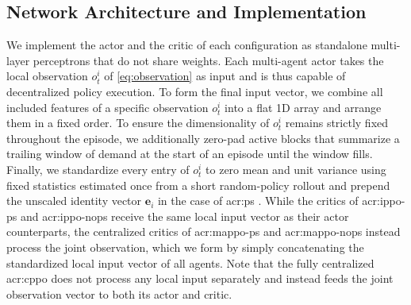 \subsection{Network Architecture and Implementation}
\label{subsec:network-architecture}
We implement the actor and the critic of each configuration as standalone multi-layer perceptrons that do not share weights. Each multi-agent actor takes the local observation $o^i_t$ of \autoref{eq:observation} as input and is thus capable of decentralized policy execution. To form the final input vector, we combine all included features of a specific observation $o_t^i$ into a flat 1D array and arrange them in a fixed order. To ensure the dimensionality of $o^i_t$ remains strictly fixed throughout the episode, we additionally zero-pad active blocks that summarize a trailing window of demand at the start of an episode until the window fills. Finally, we standardize every entry of $o_t^i$ to zero mean and unit variance using fixed statistics estimated once from a short random-policy rollout and prepend the unscaled identity vector $\mathbf{e}_i$ in the case of \gls{acr:ps} \citep{terry2020revisiting}. While the critics of \gls{acr:ippo-ps} and \gls{acr:ippo-nops} receive the same local input vector as their actor counterparts, the centralized critics of \gls{acr:mappo-ps} and \gls{acr:mappo-nops} instead process the joint observation, which we form by simply concatenating the standardized local input vector of all agents. Note that the fully centralized \gls{acr:cppo} does not process any local input separately and instead feeds the joint observation vector to both its actor and critic.

